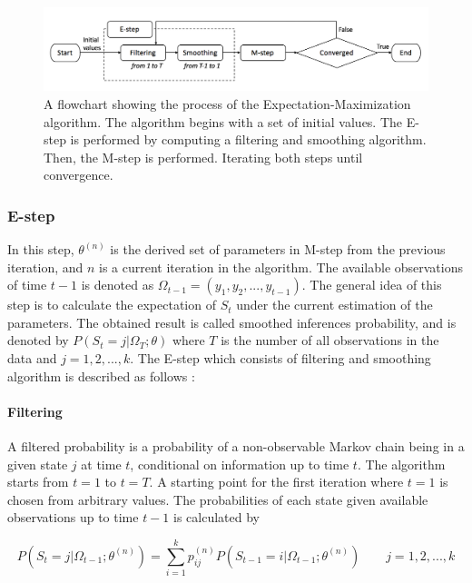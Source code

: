 \begin{figure}[H]
\begin{centering}
\includegraphics[scale=0.55]{picture/em}
\par\end{centering}
\caption{A flowchart showing the process of the Expectation-Maximization algorithm.
The algorithm begins with a set of initial values. The E-step is performed
by computing a filtering and smoothing algorithm. Then, the M-step
is performed. Iterating both steps until convergence.}

\label{em}
\end{figure}


\subsubsection{E-step}

In this step, $\theta^{(n)}$ is the derived set of parameters in
M-step from the previous iteration, and $n$ is a current iteration
in the algorithm. The available observations of time $t-1$ is denoted
as $\Omega_{t-1}=(y_{1},y_{2},...,y_{t-1})$. The general idea of
this step is to calculate the expectation of $S_{t}$ under the current
estimation of the parameters. The obtained result is called smoothed
inferences probability, and is denoted by $P(S_{t}=j|\Omega_{T};\theta)$
where $T$ is the number of all observations in the data and $j=1,2,...,k$.
The E-step which consists of filtering and smoothing algorithm is
described as follows \citep{kim1994dynamic}:

\paragraph{Filtering}

A filtered probability is a probability of a non-observable Markov
chain being in a given state $j$ at time $t$, conditional on information
up to time $t$. The algorithm starts from $t=1$ to $t=T$. A starting
point for the first iteration where $t=1$ is chosen from arbitrary
values. The probabilities of each state given available observations
up to time $t-1$ is calculated by

\begin{equation}
P(S_{t}=j|\Omega_{t-1};\theta^{(n)})=\sum_{i=1}^{k}p_{ij}^{(n)}P(S_{t-1}=i|\Omega_{t-1};\theta^{(n)})\qquad j=1,2,...,k
\end{equation}

